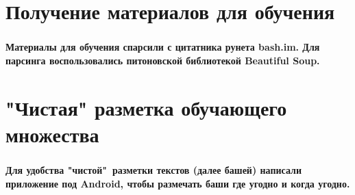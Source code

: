 \documentclass[t]{beamer}
\begin{document}
	
	\section{Получение материалов для обучения}
	\begin{frame}
		\frametitle{\insertsection}
		\textbf{Материалы для обучения спарсили с цитатника рунета bash.im. Для парсинга воспользовались питоновской библиотекой Beautiful Soup.}
	\end{frame}
	
	
	\section{"Чистая" разметка обучающего множества}
	\begin{frame}
		\frametitle{\insertsection}
		\textbf{ Для удобства "чистой"\ разметки текстов (далее башей) написали приложение под Android, чтобы размечать баши где угодно и когда угодно.}
		

\end{frame}
\end{document}
